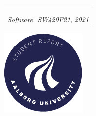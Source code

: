 \begin{titlepage}
{{\begin{tabular}{@{}p{\textwidth}@{}}
\begin{center}
{      }
    \end{center}
   \begin{center}
    {\large
      Christian Houmann, Ivik Hostrup, Patrick Østergaard%
    }\\
    \vspace{0.4cm}
    {\large
      \textit{Software, SW420F21, 2021}%
    }
  \end{center}
   \vspace{0.2cm}
  \end{tabular}}}
  \vfill
  \begin{center}
    \includegraphics[width=0.2\paperwidth]{AAUgraphics/aau_logo_circle_en}%
  \end{center}
\end{titlepage}
\clearpage
